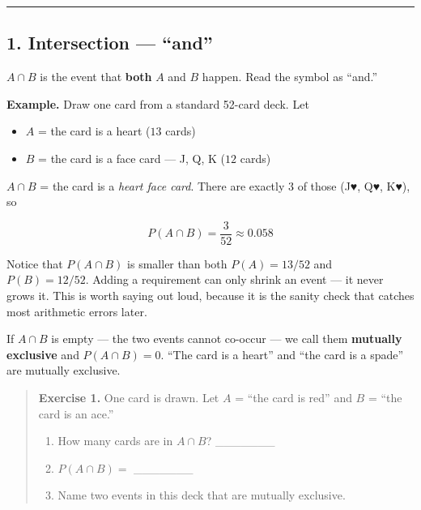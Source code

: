 \documentclass[
]{article}
\providecommand{\tightlist}{%
  \setlength{\itemsep}{0pt}\setlength{\parskip}{0pt}}
\begin{document}
\begin{center}\rule{0.5\linewidth}{0.5pt}\end{center}

\subsection{\texorpdfstring{1. Intersection ---
``\textbf{and}''}{1. Intersection --- ``and''}}\label{intersection-and}

\(A \cap B\) is the event that \textbf{both} \(A\) and \(B\) happen.
Read the symbol as ``and.''

\textbf{Example.} Draw one card from a standard 52-card deck. Let

\begin{itemize}
\tightlist
\item
  \(A\) = the card is a heart (\(13\) cards)
\item
  \(B\) = the card is a face card --- J, Q, K (\(12\) cards)
\end{itemize}

\(A \cap B\) = the card is a \emph{heart face card}. There are exactly 3
of those (J♥, Q♥, K♥), so

\[P(A \cap B) = \frac{3}{52} \approx 0.058\]

Notice that \(P(A \cap B)\) is smaller than both \(P(A) = 13/52\) and
\(P(B) = 12/52\). Adding a requirement can only shrink an event --- it
never grows it. This is worth saying out loud, because it is the sanity
check that catches most arithmetic errors later.

If \(A \cap B\) is empty --- the two events cannot co-occur --- we call
them \textbf{mutually exclusive} and \(P(A \cap B) = 0\). ``The card is
a heart'' and ``the card is a spade'' are mutually exclusive.

\begin{quote}
\textbf{Exercise 1.} One card is drawn. Let \(A\) = ``the card is red''
and \(B\) = ``the card is an ace.''

\begin{enumerate}
\def\labelenumi{(\alph{enumi})}
\tightlist
\item
  How many cards are in \(A \cap B\)? \_\_\_\_\_\_\_
\item
  \(P(A \cap B)=\) \_\_\_\_\_\_\_
\item
  Name two events in this deck that are mutually exclusive.
\end{enumerate}
\end{quote}
\end{document}
